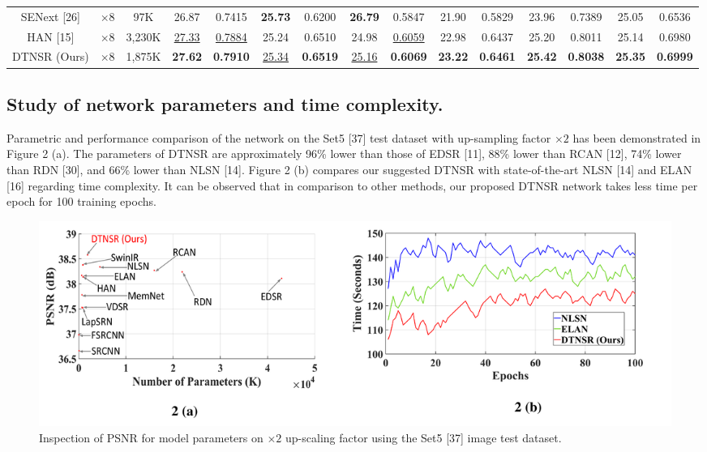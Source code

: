 \documentclass[journal]{IEEEtran}
\begin{document}
\begin{table}
\begin{tabular}{|c|c|c|cc|cc|cc|cc|cc|cc|}
SENext [26] & $\times8$ &97K& \multicolumn{1}{c|}{26.87} &{0.7415} & \multicolumn{1}{c|}{\color{red}\textbf{25.73}} &{0.6200} & \multicolumn{1}{c|}{\color{red}\textbf{26.79}} &{0.5847} & \multicolumn{1}{c|}{21.90} &{0.5829} & \multicolumn{1}{c|}{23.96} &{0.7389} &\multicolumn{1}{c|}{25.05} &{0.6536}  \\


HAN [15] & $\times8$&3,230K& \multicolumn{1}{c|}{\color{blue}\underline{27.33}} &{\color{blue}\underline{0.7884}}   & \multicolumn{1}{c|}{25.24} & 0.6510   &\multicolumn{1}{c|}{24.98} &{\color{blue}\underline{0.6059}}   & \multicolumn{1}{c|}{22.98} &{0.6437} & \multicolumn{1}{c|}{25.20}  &{0.8011} &\multicolumn{1}{c|}{25.14} &{0.6980} \\

DTNSR (Ours) & $\times8$ &1,875K& \multicolumn{1}{c|}{\color{red}\textbf{27.62}} &{\color{red}\textbf{0.7910}} & \multicolumn{1}{c|}{\color{blue}\underline{25.34}} &{\color{red}\textbf{0.6519}} & \multicolumn{1}{c|}{\color{blue}\underline{25.16}} &{\color{red}\textbf{0.6069}} & \multicolumn{1}{c|}{\color{red}\textbf{23.22}} &{\color{red}\textbf{0.6461}} & \multicolumn{1}{c|}{\color{red}\textbf{25.42}} &{\color{red}\textbf{0.8038}} &\multicolumn{1}{c|}{\color{red}\textbf{25.35}} &{\color{red}\textbf{0.6999}}  \\

\hline

\end{tabular}
\end{table}

\subsection{Study of network parameters and time complexity.}

Parametric and performance comparison of the network on the Set5 [37] test dataset with up-sampling factor $\times 2$ has been demonstrated in Figure 2 (a).  The parameters of DTNSR are approximately 96\% lower than those of EDSR [11], 88\% lower than RCAN [12], 74\% lower than RDN [30], and 66\% lower than NLSN [14]. 
Figure 2 (b) compares our suggested DTNSR with state-of-the-art NLSN [14] and ELAN [16] regarding time complexity. It can be observed that in comparison to other methods, our proposed DTNSR network takes less time per epoch for 100 training epochs. 

\begin{figure}[ht]
  \includegraphics[width=\linewidth]{2FIGURE.pdf}
  \caption{Inspection of PSNR for model parameters on $\times2$ up-scaling factor using the Set5 [37] image test dataset.}
  \label{fig:6}
\end{figure}
\end{document}
